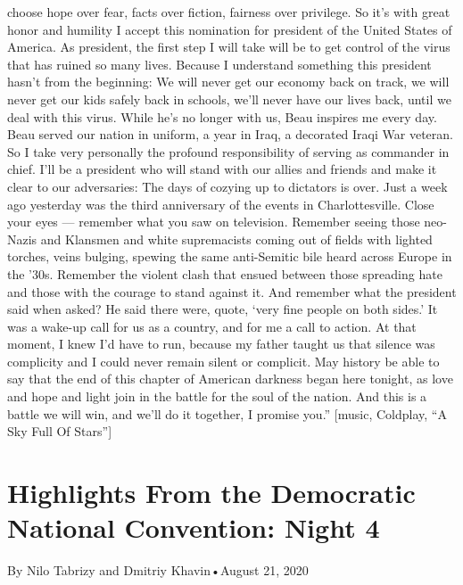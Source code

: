 \begin{itemize}
  choose hope over fear, facts over fiction, fairness over privilege. So
  it's with great honor and humility I accept this nomination for
  president of the United States of America. As president, the first
  step I will take will be to get control of the virus that has ruined
  so many lives. Because I understand something this president hasn't
  from the beginning: We will never get our economy back on track, we
  will never get our kids safely back in schools, we'll never have our
  lives back, until we deal with this virus. While he's no longer with
  us, Beau inspires me every day. Beau served our nation in uniform, a
  year in Iraq, a decorated Iraqi War veteran. So I take very personally
  the profound responsibility of serving as commander in chief. I'll be
  a president who will stand with our allies and friends and make it
  clear to our adversaries: The days of cozying up to dictators is over.
  Just a week ago yesterday was the third anniversary of the events in
  Charlottesville. Close your eyes --- remember what you saw on
  television. Remember seeing those neo-Nazis and Klansmen and white
  supremacists coming out of fields with lighted torches, veins bulging,
  spewing the same anti-Semitic bile heard across Europe in the '30s.
  Remember the violent clash that ensued between those spreading hate
  and those with the courage to stand against it. And remember what the
  president said when asked? He said there were, quote, `very fine
  people on both sides.' It was a wake-up call for us as a country, and
  for me a call to action. At that moment, I knew I'd have to run,
  because my father taught us that silence was complicity and I could
  never remain silent or complicit. May history be able to say that the
  end of this chapter of American darkness began here tonight, as love
  and hope and light join in the battle for the soul of the nation. And
  this is a battle we will win, and we'll do it together, I promise
  you.'' {[}music, Coldplay, ``A Sky Full Of Stars''{]}
\end{itemize}

\hypertarget{highlights-from-the-democratic-national-convention-night-4-1}{%
\section{Highlights From the Democratic National Convention: Night
4}\label{highlights-from-the-democratic-national-convention-night-4-1}}

By Nilo Tabrizy and Dmitriy Khavin•August 21, 2020

